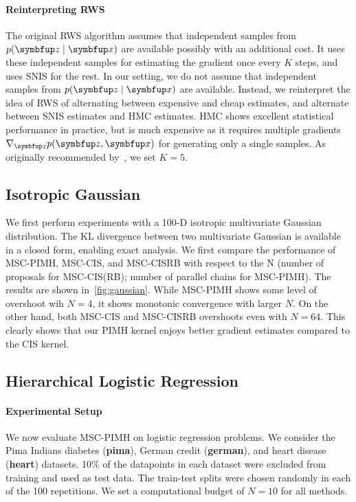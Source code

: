 \paragraph{Reinterpreting RWS}
The original RWS algorithm assumes that independent samples from \(p(\vz\mid\vx)\) are available possibly with an additional cost.
It uses these independent samples for estimating the gradient once every \(K\) steps, and uses SNIS for the rest.
In our setting, we do not assume that independent samples from \(p(\vz\mid\vx)\) are available.
Instead, we reinterpret the idea of RWS of alternating between expensive and cheap estimates, and alternate between SNIS estimates and HMC estimates.
HMC shows excellent statistical performance in practice, but is much expensive as it requires multiple gradients \(\nabla_{\vz} p(\vz, \vx)\) for generating only a single samples.
As originally recommended by~\citet{DBLP:journals/corr/BornscheinB14}, we set \(K=5\).

\subsection{Isotropic Gaussian}
We first perform experiments with a 100-D isotropic multivariate Gaussian distribution.
The KL divergence between two multivariate Gaussian is available in a closed form, enabling exact analysis.
We first compare the performance of MSC-PIMH, MSC-CIS, and MSC-CISRB with respect to the N (number of proposals for MSC-CIS(RB); number of parallel chains for MSC-PIMH).
The results are shown in~\cref{fig:gaussian}.
While MSC-PIMH shows some level of overshoot wih \(N=4\), it shows monotonic convergence with larger \(N\).
On the other hand, both MSC-CIS and MSC-CISRB overshoots even with \(N=64\).
This clearly shows that our PIMH kernel enjoys better gradient estimates compared to the CIS kernel.

\subsection{Hierarchical Logistic Regression}\label{section:logistic}
\paragraph{Experimental Setup}
We now evaluate MSC-PIMH on logistic regression problems.
We consider the Pima Indians diabetes (\textbf{pima}), German credit (\textbf{german}), and heart disease (\textbf{heart}) datasets.
10\% of the datapoints in each dataset were excluded from training and used as test data.
The train-test splits were chosen randomly in each of the 100 repetitions.
We set a computational budget of \(N=10\) for all methods.

